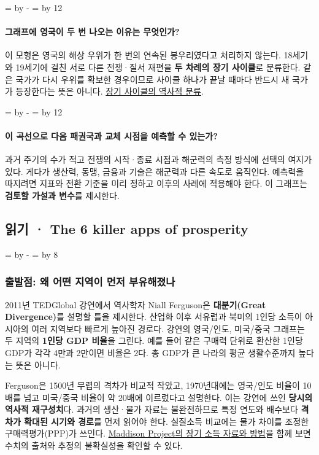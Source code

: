 \documentclass[10pt,a4paper]{article}
\newcommand{\ReserveQuestionSpace}{%
  \par\begingroup
  \dimen0=\pagegoal \advance\dimen0 by -\pagetotal
  \dimen2=\baselineskip \multiply\dimen2 by 12
  \ifdim\dimen0<\dimen2 \newpage\fi
  \endgroup}
\newcommand{\ReserveReadingSectionSpace}{%
  \par\begingroup
  \dimen0=\pagegoal \advance\dimen0 by -\pagetotal
  \dimen2=\baselineskip \multiply\dimen2 by 8
  \ifdim\dimen0<\dimen2 \newpage\fi
  \endgroup}
\begin{document}
\ReserveQuestionSpace
\paragraph{그래프에 영국이 두 번 나오는 이유는 무엇인가?}
이 모형은 영국의 해상 우위가 한 번의 연속된 봉우리였다고 처리하지 않는다. 18세기와 19세기에 걸친 서로 다른 전쟁·질서 재편을 \textbf{두 차례의 장기 사이클}로 분류한다. 같은 국가가 다시 우위를 확보한 경우이므로 사이클 하나가 끝날 때마다 반드시 새 국가가 등장한다는 뜻은 아니다. \href{https://irows.ucr.edu/papers/irows115/irows115.htm}{장기 사이클의 역사적 분류}.\par

\ReserveQuestionSpace
\paragraph{이 곡선으로 다음 패권국과 교체 시점을 예측할 수 있는가?}
과거 주기의 수가 적고 전쟁의 시작·종료 시점과 해군력의 측정 방식에 선택의 여지가 있다. 게다가 생산력, 동맹, 금융과 기술은 해군력과 다른 속도로 움직인다. 예측력을 따지려면 지표와 전환 기준을 미리 정하고 이후의 사례에 적용해야 한다. 이 그래프는 \textbf{검토할 가설과 변수}를 제시한다.\par

\clearpage{}
{}
\subsection*{읽기 · The 6 killer apps of prosperity}
\ReserveReadingSectionSpace
\subsubsection*{출발점: 왜 어떤 지역이 먼저 부유해졌나}

2011년 TEDGlobal 강연에서 역사학자 Niall Ferguson은 \textbf{대분기(Great Divergence)}를 설명할 틀을 제시한다. 산업화 이후 서유럽과 북미의 1인당 소득이 아시아의 여러 지역보다 빠르게 높아진 경로다. 강연의 영국/인도, 미국/중국 그래프는 두 지역의 \textbf{1인당 GDP 비율}을 그린다. 예를 들어 같은 구매력 단위로 환산한 1인당 GDP가 각각 4만과 2만이면 비율은 2다. 총 GDP가 큰 나라의 평균 생활수준까지 높다는 뜻은 아니다.\par

Ferguson은 1500년 무렵의 격차가 비교적 작았고, 1970년대에는 영국/인도 비율이 10배를 넘고 미국/중국 비율이 약 20배에 이르렀다고 설명한다. 이는 강연에 쓰인 \textbf{당시의 역사적 재구성치}다. 과거의 생산·물가 자료는 불완전하므로 특정 연도와 배수보다 \textbf{격차가 확대된 시기와 경로}를 먼저 읽어야 한다. 실질소득 비교에는 물가 차이를 조정한 구매력평가(PPP)가 쓰인다. \href{https://www.rug.nl/ggdc/historicaldevelopment/maddison/releases/maddison-project-database-2023?lang=en}{Maddison Project의 장기 소득 자료와 방법}을 함께 보면 수치의 출처와 추정의 불확실성을 확인할 수 있다.\par
\end{document}
